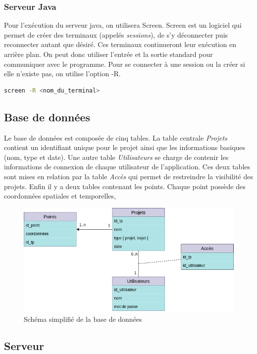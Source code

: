 \subsubsection{Serveur Java}

Pour l'exécution du serveur java, on utilisera Screen.
Screen est un logiciel qui permet de créer des terminaux (appelés \emph{sessions}), de s'y déconnecter puis reconnecter autant que désiré.
Ces terminaux continueront leur exécution en arrière plan. On peut donc utiliser l'entrée et la sortie standard pour communiquer avec le programme.
Pour se connecter à une session ou la créer si elle n'existe pas, on utilise l'option -R.
\begin{lstlisting}[language=bash]
    screen -R <nom_du_terminal>
\end{lstlisting}

\subsection{Base de données}
Le base de données est composée de cinq tables. La table centrale \emph{Projets} contient un identifiant unique pour le projet ainsi que les informations basiques (nom, type et date).
Une autre table \emph{Utilisateurs} se charge de contenir les informations de connexion de chaque utilisateur de l'application. Ces deux tables sont mises en relation par la table \emph{Accès} qui permet de restreindre la visibilité des projets.
Enfin il y a deux tables contenant les points. Chaque point possède des coordonnées spatiales et temporelles, 
\begin{figure}[ht]
    \label{Schéma de la base de données}
    \centering
    \includegraphics[scale=0.6]{images/bdd.png}
    \caption{Schéma simplifié de la base de données}
\end{figure}

\subsection{Serveur}
